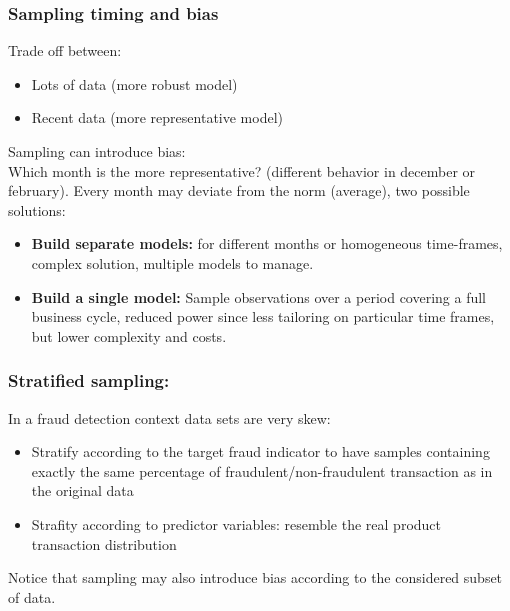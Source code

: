             \subsubsection{Sampling timing and bias}
                Trade off between:
                \begin{itemize}
                    \item Lots of data (more robust model)
                    \item Recent data (more representative model)
                \end{itemize}
                Sampling can introduce bias:\\
                Which month is the more representative? (different behavior in december or february).
                Every month may deviate from the norm (average), two possible solutions:
                \begin{itemize}
                    \item \textbf{Build separate models:}  for different months or homogeneous time-frames, complex solution, multiple models to manage.
                    \item \textbf{Build a single model:} Sample observations over a period covering a full business cycle, reduced power since less tailoring on particular time frames, but lower complexity and costs.
                \end{itemize}
            \subsubsection{Stratified sampling:}
                In a fraud detection context data sets are very skew:
                \begin{itemize}
                    \item Stratify according to the target fraud indicator to have samples containing exactly the same percentage of fraudulent/non-fraudulent transaction as in the original data
                    \item Strafity according to predictor variables: resemble the real product transaction distribution
                \end{itemize}
                Notice that sampling may also introduce bias according to the considered subset of data.